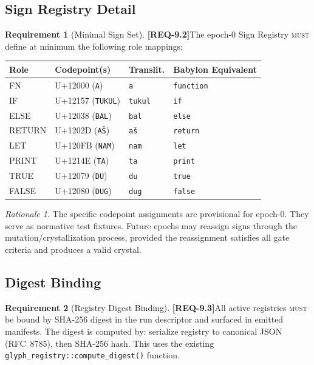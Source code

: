\documentclass[11pt,a4paper,twoside]{article}
\theoremstyle{definition}
\newtheorem{requirement}{Requirement}[section]
\theoremstyle{remark}
\newtheorem{rationale}{Rationale}[section]
\newcommand{\req}[1]{\textbf{\textcolor{reqred}{[REQ-#1]}}}
\newcommand{\must}{\textsc{must}}
\begin{document}
\subsection{Sign Registry Detail}
\label{sec:sign-registry}

\begin{requirement}[Minimal Sign Set]
\label{req:sign-set}
\req{9.2}\quad The epoch-0 Sign Registry \must{} define at minimum the following role mappings:
\end{requirement}

\begin{longtable}{lllp{4.5cm}}
\toprule
\textbf{Role} & \textbf{Codepoint(s)} & \textbf{Translit.} & \textbf{Babylon Equivalent} \\
\midrule
\endfirsthead
FN       & U+12000 (\texttt{A})       & \texttt{a}     & \texttt{function} \\
IF       & U+12157 (\texttt{TUKUL})   & \texttt{tukul} & \texttt{if} \\
ELSE     & U+12038 (\texttt{BAL})     & \texttt{bal}   & \texttt{else} \\
RETURN   & U+1202D (\texttt{AŠ})      & \texttt{aš}    & \texttt{return} \\
LET      & U+120FB (\texttt{NAM})     & \texttt{nam}   & \texttt{let} \\
PRINT    & U+1214E (\texttt{TA})      & \texttt{ta}    & \texttt{print} \\
TRUE     & U+12079 (\texttt{DU})      & \texttt{du}    & \texttt{true} \\
FALSE    & U+12080 (\texttt{DUG})     & \texttt{dug}   & \texttt{false} \\
\bottomrule
\end{longtable}

\begin{rationale}
The specific codepoint assignments are provisional for epoch-0. They serve as normative test fixtures. Future epochs may reassign signs through the mutation/crystallization process, provided the reassignment satisfies all gate criteria and produces a valid crystal.
\end{rationale}

\subsection{Digest Binding}

\begin{requirement}[Registry Digest Binding]
\label{req:digest-binding}
\req{9.3}\quad All active registries \must{} be bound by SHA-256 digest in the run descriptor and surfaced in emitted manifests. The digest is computed by: serialize registry to canonical JSON (RFC~8785), then SHA-256 hash. This uses the existing \texttt{glyph\_registry::compute\_digest()} function.
\end{requirement}
\end{document}

